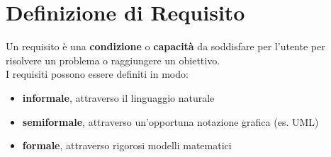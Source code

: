 \section{Definizione di Requisito}
Un requisito è una \textbf{condizione} o \textbf{capacità} da soddisfare per l'utente per risolvere un problema o raggiungere un obiettivo. \\
I requisiti possono essere definiti in modo:
\begin{itemize}
    \item \textbf{informale}, attraverso il linguaggio naturale
    \item \textbf{semiformale}, attraverso un'opportuna notazione grafica (es. UML)
    \item \textbf{formale}, attraverso rigorosi modelli matematici
\end{itemize}
